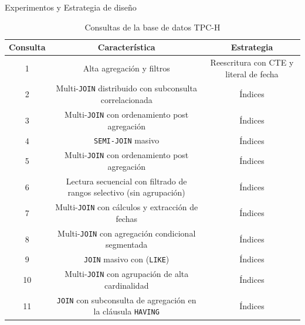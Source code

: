 \documentclass[10pt]{beamer}
\begin{document}
    \begin{frame}{Experimentos y Estrategia de diseño}
      \begin{table}
        \tiny
        \caption{Consultas de la base de datos TPC-H}
        \begin{tabular}{c c c}
          \textbf{Consulta} & \textbf{Característica}                                                         & \textbf{Estrategia}                    \\ \hline
          1                 & Alta agregación y filtros                                                       & Reescritura con CTE y literal de fecha \\ \hline
          2                 & Multi-\texttt{JOIN} distribuido con subconsulta correlacionada                  & Índices                                \\ \hline
          3                 & Multi-\texttt{JOIN} con ordenamiento post agregación                            & Índices                                \\ \hline
          4                 & \texttt{SEMI-JOIN} masivo                                                       & Índices                                \\ \hline
          5                 & Multi-\texttt{JOIN} con ordenamiento post agregación                            & Índices                                \\ \hline
          6                 & Lectura secuencial con filtrado de rangos selectivo (sin agrupación)            & Índices                                \\ \hline
          7                 & Multi-\texttt{JOIN} con cálculos y extracción de fechas                         & Índices                                \\ \hline
          8                 & Multi-\texttt{JOIN} con agregación condicional segmentada                       & Índices                                \\ \hline
          9                 & \texttt{JOIN} masivo con (\texttt{LIKE})                                        & Índices                                \\ \hline
          10                & Multi-\texttt{JOIN} con agrupación de alta cardinalidad                         & Índices                                \\ \hline
          11                & \texttt{JOIN} con subconsulta de agregación en la cláusula \texttt{HAVING}      & Índices                                \\ \hline

\end{tabular}
\end{table}
\end{frame}
\end{document}
